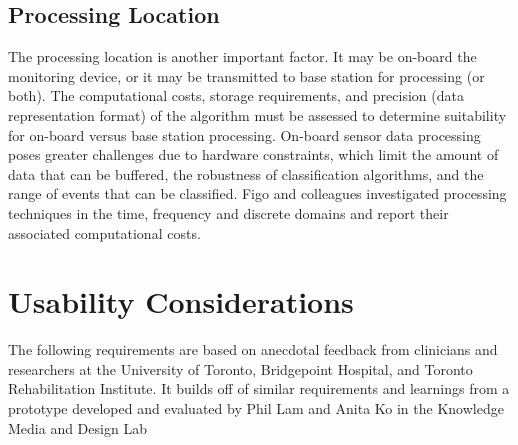 \documentclass[11pt, oneside]{report}   	%
\begin{document}
\subsection{Processing Location}

The processing location is another important factor. It may be on-board the monitoring device, or it may be transmitted to base station for processing (or both)\cite{Khusainov2013}. The computational costs, storage requirements, and precision (data representation format) of the algorithm must be assessed to determine suitability for on-board versus base station processing\cite{Khusainov2013}. On-board sensor data processing poses greater challenges due to hardware constraints, which limit the amount of data that can be buffered, the robustness of classification algorithms, and the range of events that can be classified\cite{Karantonis2006}. Figo and colleagues\cite{Figo2010} investigated processing techniques in the time, frequency and discrete domains and report their associated computational costs.

\section{Usability Considerations}

The following requirements are based on anecdotal feedback from clinicians and researchers at the University of Toronto, Bridgepoint Hospital, and Toronto Rehabilitation Institute. It builds off of similar requirements and learnings from a prototype developed and evaluated by Phil Lam and Anita Ko in the Knowledge Media and Design Lab\cite{Lam2012, Ko2012}
\end{document}
